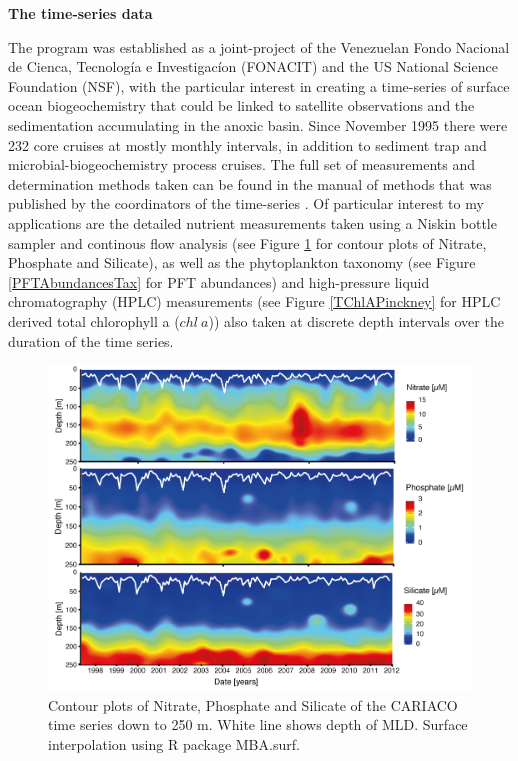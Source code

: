 {\textbf{The time-series data}}

The program was established as a joint-project of the Venezuelan Fondo Nacional de Cienca, Tecnolog\'{i}a e Investigac\'{i}on (FONACIT) and the US National Science Foundation (NSF), with the particular interest in creating a time-series of surface ocean biogeochemistry that could be linked to satellite observations and the sedimentation accumulating in the anoxic basin. Since  November 1995 there were 232 core cruises at mostly monthly intervals, in addition to sediment trap and microbial-biogeochemistry process cruises. The full set of measurements and determination methods taken can be found in the manual of methods that was published by the coordinators of the time-series \citep{Astor2013}. Of particular interest to my applications are the detailed nutrient measurements taken using a Niskin bottle sampler and continous flow analysis (see Figure \ref{CARIACOnuts} for contour plots of Nitrate, Phosphate and Silicate), as well as the phytoplankton taxonomy (see Figure \ref{PFTAbundancesTax} for PFT abundances) and high-pressure liquid chromatography (HPLC) measurements (see Figure \ref{TChlAPinckney} for HPLC derived total chlorophyll a ($chl~a$)) also taken at discrete depth intervals over the duration of the time series. 

\begin{figure}
\centering
\includegraphics[trim = 0mm 0mm 0mm 0mm, clip, width=1.\linewidth]{./Chp1-Intro/NUTSatCARIACOAsset811.png}
\caption[Scheme]{\small {Contour plots of Nitrate, Phosphate and Silicate of the CARIACO time series down to 250 m. White line shows depth of MLD. Surface interpolation using R package MBA.surf.}}
\label{CARIACOnuts}
\end{figure}

